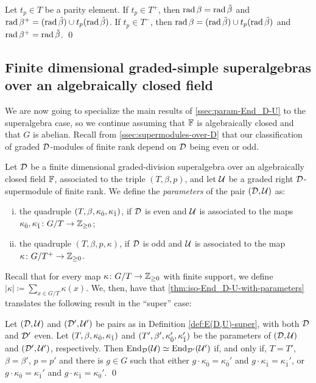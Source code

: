 \begin{cor}\label{cor:radical-with-parity}
    Let $t_p\in T$ be a parity element. 
    If $t_p\in T^+$, then $\operatorname{rad} \beta = \operatorname{rad} \tilde\beta$ and $\operatorname{rad} \beta^+ = (\operatorname{rad} \tilde\beta) \cup  t_p(\operatorname{rad} \tilde\beta)$. 
    If $t_p\in T^-$, then $\operatorname{rad} \beta = (\operatorname{rad} \tilde\beta) \cup  t_p(\operatorname{rad} \tilde\beta)$ and $\operatorname{rad} \beta^+ = \operatorname{rad} \tilde\beta$. \qed
\end{cor}



\subsection{Finite dimensional graded-simple superalgebras over an algebraically closed field}\label{ssec:classification-assc-super}

We are now going to specialize the main results of \cref{ssec:param-End_D-U} to the superalgebra case, so we continue assuming that $\mathbb{F}$ is algebraically closed and that $G$ is abelian. 
Recall from \cref{ssec:supermodules-over-D} that our classification of graded $\mathcal{D}$-modules of finite rank depend on $\mathcal{D}$ being even or odd.

\begin{defi}\label{def:E(D,U)-super}
    Let $\mathcal{D}$ be a finite dimensional graded-division superalgebra over an algebraically closed field $\mathbb{F}$, associated to the triple $(T, \beta, p)$, and let $\mathcal U$ be a graded right $\mathcal{D}$-supermodule of finite rank. 
    We define the \emph{parameters} of the pair $(\mathcal{D}, \mathcal U)$ as:
    \begin{enumerate}[(i)]
        \item the quadruple $(T, \beta, \kappa_{\bar{0}}, \kappa_{\bar{1}})$, if $\mathcal{D}$ is even and $\mathcal U$ is associated to the maps $\kappa_{\bar{0}}, \kappa_{\bar{1}} \colon G/T \to \mathbb{Z}_{\geq 0}$;
        \item the quadruple $(T, \beta, p, \kappa)$, if $\mathcal{D}$ is odd and $\mathcal U$ is associated to the map $\kappa\colon G/T^+ \to \mathbb{Z}_{\geq 0}$.
    \end{enumerate}
\end{defi}

Recall that for every map $\kappa\colon G/T\to \mathbb{Z}_{\geq 0}$ with finite support, we define $|\kappa| \coloneqq \sum_{x \in G/T} \kappa(x)$. 
We, then, have that  \cref{thm:iso-End_D-U-with-parameters} translates the following result in the ``super'' case:

\begin{thm}\label{thm:iso-D-even}
	Let $(\mathcal{D}, \mathcal U)$ and $(\mathcal{D}', \mathcal U')$ be pairs as in Definition \ref{def:E(D,U)-super}, with both $\mathcal{D}$ and $\mathcal{D}'$ even. 
	Let $(T, \beta, \kappa_{\bar{0}}, \kappa_{\bar{1}})$ and $(T', \beta', \kappa_{\bar{0}}', \kappa_{\bar{1}}')$ be the parameters of $(\mathcal{D}, \mathcal U)$ and $(\mathcal{D}', \mathcal U')$, respectively. 
	Then $\operatorname{End}_{\mathcal{D}} (\mathcal U) \simeq \operatorname{End}_{\mathcal{D}'} (\mathcal U')$ if, and only if, $T=T'$, $\beta=\beta'$, $p = p'$ and there is $g\in G$ such that either $g \cdot \kappa_{\bar 0}=\kappa_{\bar 0}'$ and $g \cdot \kappa_{\bar 1}=\kappa_{\bar 1}'$, or $g \cdot \kappa_{\bar 0}=\kappa_{\bar 1}'$ and $g \cdot \kappa_{\bar 1}=\kappa_{\bar 0}'$. \qed
\end{thm}

